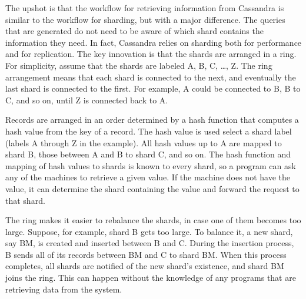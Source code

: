 The upshot is that the workflow for retrieving information from Cassandra
is similar to the workflow for sharding, but with a major difference.
The queries that are generated do not need to be aware
of which shard contains the information they need.
In fact, Cassandra relies on sharding both for performance and for replication.
The key innovation is that the shards are arranged in a ring.
For simplicity, assume that the shards are labeled A, B, C, \dots, Z.
The ring arrangement means that each shard is connected to the next,
and eventually the last shard is connected to the first.
For example, A could be connected to B, B to C, and so on, until Z is connected back to A.

Records are arranged in an order determined by a hash function
that computes a hash value from the key of a record.
The hash value is used select a shard label (labels A through Z in the example).
All hash values up to A are mapped to shard B,
those between A and B to shard C, and so on.
The hash function and mapping of hash values to shards is known to every shard,
so a program can ask any of the machines to retrieve a given value.
If the machine does not have the value,
it can determine the shard containing the value
and forward the request to that shard.

The ring makes it easier to rebalance the shards,
in case one of them becomes too large.
Suppose, for example, shard B gets too large.
To balance it, a new shard, say BM, is created and inserted between B and C.
During the insertion process, B sends all of its records between BM and C to shard BM.
When this process completes, all shards are notified of the new
shard's existence, and shard BM joins the ring.
This can happen without the knowledge of any programs
that are retrieving data from the system.


